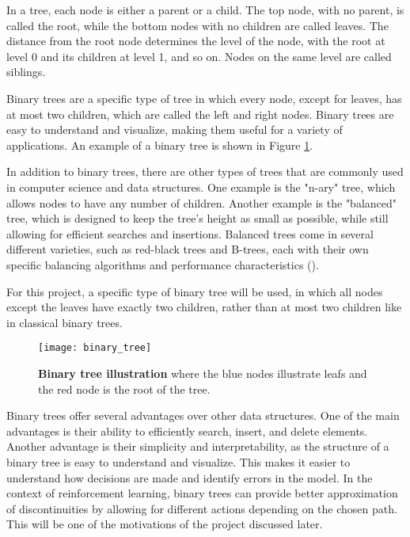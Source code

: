 In a tree, each node is either a parent or a child. The top node, with no parent, is called the root, while the bottom nodes with no children are called leaves. The distance from the root node determines the level of the node, with the root at level 0 and its children at level 1, and so on. Nodes on the same level are called siblings.

Binary trees are a specific type of tree in which every node, except for leaves, has at most two children, which are called the left and right nodes. Binary trees are easy to understand and visualize, making them useful for a variety of applications. An example of a binary tree is shown in Figure \ref{fig:binary_tree}.

In addition to binary trees, there are other types of trees that are commonly used in computer science and data structures. One example is the "n-ary" tree, which allows nodes to have any number of children. Another example is the "balanced" tree, which is designed to keep the tree's height as small as possible, while still allowing for efficient searches and insertions. Balanced trees come in several different varieties, such as red-black trees and B-trees, each with their own specific balancing algorithms and performance characteristics (\cite{goodrich_data_nodate}).

For this project, a specific type of binary tree will be used, in which all nodes except the leaves have exactly two children, rather than at most two children like in classical binary trees.

\begin{figure}[!ht]
\centering
\texttt{[image: binary\_tree]}
\caption[Binary tree representation]{
  \textbf{Binary tree illustration} where the blue nodes illustrate leafs and the red node is the root of the tree.
  }
\label{fig:binary_tree}
\end{figure}

Binary trees offer several advantages over other data structures. One of the main advantages is their ability to efficiently search, insert, and delete elements. Another advantage is their simplicity and interpretability, as the structure of a binary tree is easy to understand and visualize. This makes it easier to understand how decisions are made and identify errors in the model. In the context of reinforcement learning, binary trees can provide better approximation of discontinuities by allowing for different actions depending on the chosen path. This will be one of the motivations of the project discussed later.

